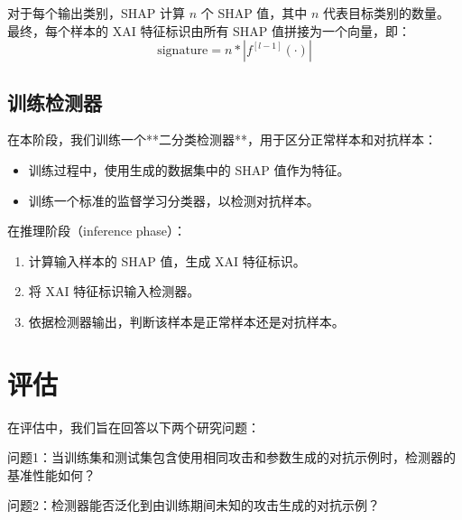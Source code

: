 \documentclass[12pt, a4paper]{ctexart} %
\begin{document}
对于每个输出类别，SHAP 计算 \( n \) 个 SHAP 值，其中 \( n \) 代表目标类别的数量。最终，每个样本的 XAI 特征标识由所有 SHAP 值拼接为一个向量，即：
\[
\text{signature} = n * |f^{[l-1]}(\cdot)|
\]
\subsection{训练检测器}
在本阶段，我们训练一个**二分类检测器**，用于区分正常样本和对抗样本：
\begin{itemize}
    \item 训练过程中，使用生成的数据集中的 SHAP 值作为特征。
    \item 训练一个标准的监督学习分类器，以检测对抗样本。
\end{itemize}

在推理阶段（inference phase）：
\begin{enumerate}
    \item 计算输入样本的 SHAP 值，生成 XAI 特征标识。
    \item 将 XAI 特征标识输入检测器。
    \item 依据检测器输出，判断该样本是正常样本还是对抗样本。
\end{enumerate}

\section{评估}
在评估中，我们旨在回答以下两个研究问题： 

问题1：当训练集和测试集包含使用相同攻击和参数生成的对抗示例时，检测器的基准性能如何？

问题2：检测器能否泛化到由训练期间未知的攻击生成的对抗示例？
\end{document}
